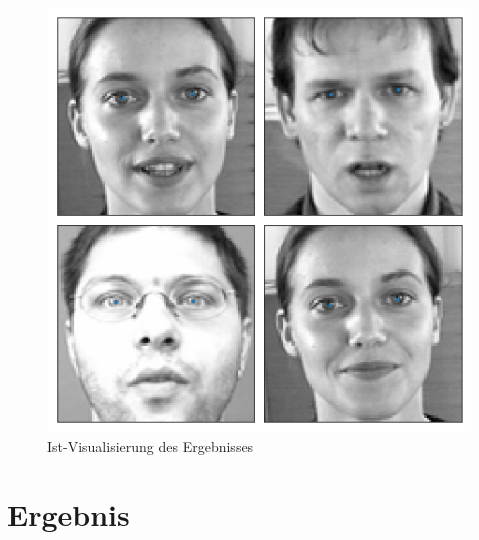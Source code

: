 \begin{figure}[ht!]
	\centering
	\includegraphics[scale=0.5]{images/normal.png}
	\caption{Ist-Visualisierung des Ergebnisses}
	\label{fig:resultPic}
\end{figure}

\section{Ergebnis}

